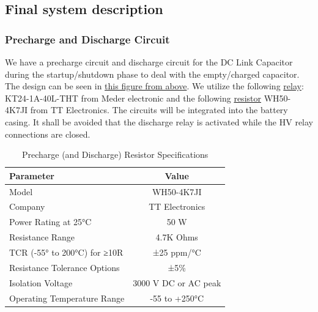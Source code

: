 \subsection{Final system description}
    
\subsubsection*{Precharge and Discharge Circuit}
We have a precharge circuit and discharge circuit for the DC Link Capacitor during the startup/shutdown phase to deal with the empty/charged capacitor. The design can be seen in \href{fig:HVSchematic}{this figure from above}.
We utilize the following \href{tab:precharge-relay-specs}{relay}: KT24-1A-40L-THT from Meder electronic and the following \href{tab:precharge-resistor}{resistor} WH50-4K7JI from TT Electronics.
The circuits will be integrated into the battery casing. It shall be avoided that the discharge relay is activated while the HV relay connections are closed.
\begin{table}[h] 
\begin{tabular}{|l|c|}
    \toprule
    Parameter & Value \\
    \midrule
    Model &  WH50-4K7JI \\
    Company & TT Electronics \\
    Power Rating at 25°C & 50 W \\
    Resistance Range & 4.7K Ohms \\
    TCR (-55° to 200°C) for ≥10R & ±25 ppm/°C \\
    Resistance Tolerance Options & ±5\% \\
    Isolation Voltage & 3000 V DC or AC peak \\
    Operating Temperature Range & -55 to +250°C \\
    \bottomrule
\end{tabular}
\label{tab:precharge-resistor}
\caption{Precharge (and Discharge) Resistor Specifications}
\end{table}

